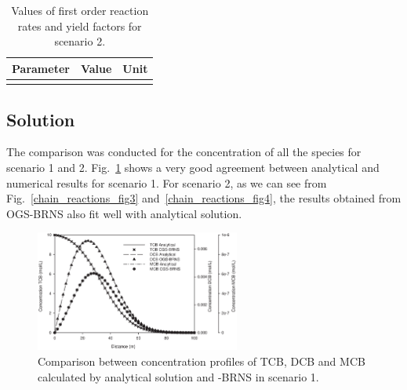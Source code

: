 \begin{table}[!th]
\begin{center}
\begin{tabular}{lrl}
\hline\noalign{\smallskip}
Parameter & Value & Unit \\
\hline\noalign{\smallskip}
\noalign{\smallskip}\hline
\end{tabular}
\end{center}
\caption{Values of first order reaction rates and yield factors for scenario 2.} 
\label{tab:chain_reaction_param}
\end{table}

\subsection{Solution}
The comparison was conducted for the concentration of all the species for scenario 1 and 2. Fig.~\ref{chain_reactions_fig2} shows a very good agreement between analytical and numerical results for scenario 1.  For scenario 2, as we can see from Fig.~\ref{chain_reactions_fig3} and~\ref{chain_reactions_fig4}, the results obtained from OGS-BRNS also fit well with analytical solution.

\begin{figure}[htbp]
\centering
\includegraphics[width=0.6\textwidth]{PART_III/HC/Chain_Reaction_Figure2_TCBdegradation3.eps}
\caption{Comparison between concentration profiles of TCB, DCB and MCB calculated by analytical solution and \GeoSys-BRNS in scenario 1. }
\label{chain_reactions_fig2}
\end{figure}

